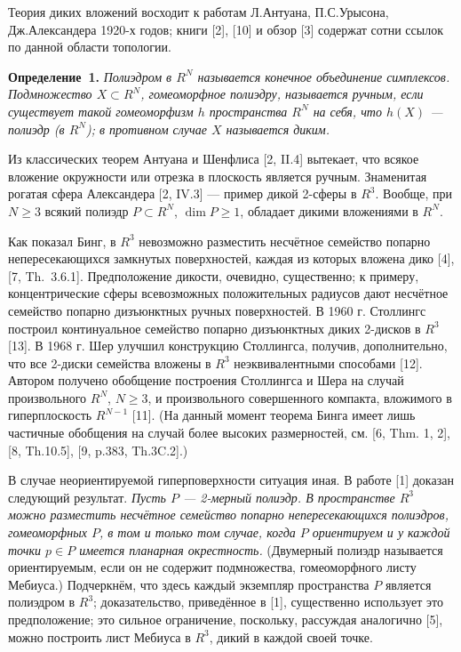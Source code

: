 \vzmscaption


Теория диких вложений
восходит к работам Л.Антуана, П.С.Урысона,
Дж.Александера 1920-х годов;
книги [2], [10] и обзор [3]
содержат сотни ссылок по данной области
топологии.

\textbf{Определение~1.} {\it
Полиэдром в $R^N$ называется
конечное объединение симплексов.
Подмножество $X\subset R^N$, гомеоморфное полиэдру,
называется ручным, если существует такой гомеоморфизм
$h$ пространства $R^N$ на себя, что
$h(X)$  --- полиэдр (в $R^N$);
в противном случае $X$ называется диким.
}

Из классических теорем Антуана и
Шенфлиса [2, II.4] вытекает, что
всякое вложение
окружности или отрезка в плоскость является
ручным.
Знаменитая рогатая сфера Александера [2, IV.3] --- пример
дикой 2-сферы в $R^3$.
Вообще, при $N\geqslant 3$
всякий полиэдр $P\subset R^N$, $\dim P\geqslant 1$,
обладает дикими вложениями в $R^N$.

Как показал Бинг,
в $R^3$ невозможно разместить
несчётное семейство попарно непересекающихся
замкнутых поверхностей,
каждая из которых вложена дико [4], [7, Th.~3.6.1].
Предположение дикости, очевидно, существенно;
к примеру, концентрические сферы всевозможных
положительных радиусов дают несчётное семейство попарно дизъюнктных ручных поверхностей.
В 1960 г. Столлингс построил континуальное
семейство попарно дизъюнктных диких 2-дисков
в $R^3$ [13].
В 1968 г. Шер улучшил конструкцию Столлингса,
получив, дополнительно, что все 2-диски
семейства вложены в $R^3$ неэквивалентными способами [12].
Автором получено обобщение построения Столлингса и Шера на случай
произвольного $R^N$, $N\geqslant 3$,
и произвольного совершенного компакта,
вложимого в гиперплоскость $R^{N-1}$ [11].
(На данный момент теорема Бинга
имеет лишь частичные обобщения на случай более высоких размерностей,
см. [6, Thm. 1, 2],
[8, Th.10.5],
[9, p.383, Th.3C.2].)

В случае неориентируемой гиперповерхности ситуация иная.
В работе [1]
доказан следующий результат.
{\it Пусть $P$ --- 2-мерный полиэдр.
В пространстве $R^3$ можно разместить несчётное
семейство попарно непересекающихся
полиэдров, гомеоморфных $P$,
в том и только том случае, когда
$P$ ориентируем и у каждой точки
$p\in P$
имеется планарная окрестность.}
(Двумерный полиэдр называется
ориентируемым, если он не содержит подмножества,
гомеоморфного листу Мебиуса.)
Подчеркнём, что
здесь каждый экземпляр пространства $P$
является полиэдром в $R^3$;
доказательство,
приведённое в [1],
существенно использует это предположение;
это сильное ограничение, поскольку,
рассуждая аналогично [5], можно построить лист Мебиуса в
$R^3$, дикий в каждой своей точке.

